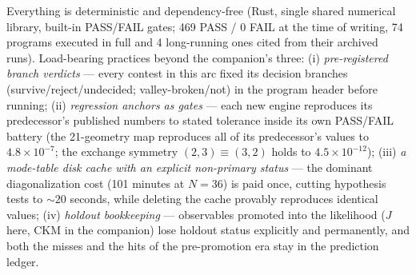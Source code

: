 \documentclass[aps,prd,preprint,nofootinbib]{revtex4-2}
\begin{document}
Everything is deterministic and dependency-free (Rust, single shared numerical
library, built-in PASS/FAIL gates; 469 PASS / 0 FAIL at the time of writing, 74
programs executed in full and 4 long-running ones cited from their archived
runs). Load-bearing practices beyond the companion's three: (i)
\emph{pre-registered branch verdicts} --- every contest in this arc fixed its
decision branches (survive/reject/undecided; valley-broken/not) in the program
header before running; (ii) \emph{regression anchors as gates} --- each new
engine reproduces its predecessor's published numbers to stated tolerance
inside its own PASS/FAIL battery (the 21-geometry map reproduces all of its
predecessor's values to $4.8\times 10^{-7}$; the exchange symmetry
$(2,3)\equiv(3,2)$ holds to $4.5\times 10^{-12}$); (iii) \emph{a mode-table
disk cache with an explicit non-primary status} --- the dominant
diagonalization cost (101 minutes at $N=36$) is paid once, cutting hypothesis
tests to $\sim 20$ seconds, while deleting the cache provably reproduces
identical values; (iv) \emph{holdout bookkeeping} --- observables promoted into
the likelihood ($J$ here, CKM in the companion) lose holdout status explicitly
and permanently, and both the misses and the hits of the pre-promotion era stay
in the prediction ledger.
\end{document}
